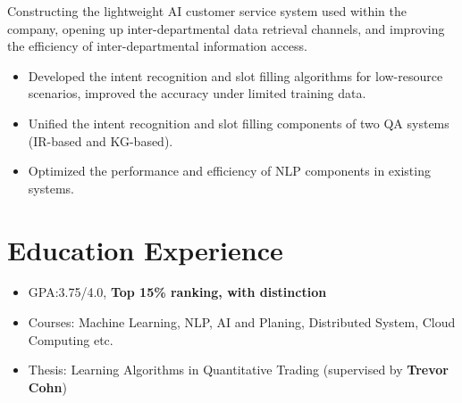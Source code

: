 \documentclass{resume_en}
\begin{document}
Constructing the lightweight AI customer service system used within the company, opening up inter-departmental data retrieval channels, and improving the efficiency of inter-departmental information access.
\begin{itemize}
  \item Developed the intent recognition and slot filling algorithms for low-resource scenarios, improved the accuracy under limited training data.
  \item Unified the intent recognition and slot filling components of two QA systems (IR-based and KG-based).
  \item Optimized the performance and efficiency of NLP components in existing systems.
\end{itemize}


\section{Education Experience}
\begin{itemize}
    \item GPA:3.75/4.0, \textbf{Top 15\% ranking, with distinction}
    \item Courses: Machine Learning, NLP, AI and Planing, Distributed System, Cloud Computing etc.
    \item Thesis: Learning Algorithms in Quantitative Trading (supervised by \textbf{Trevor Cohn})
\end{itemize}
\end{document}
